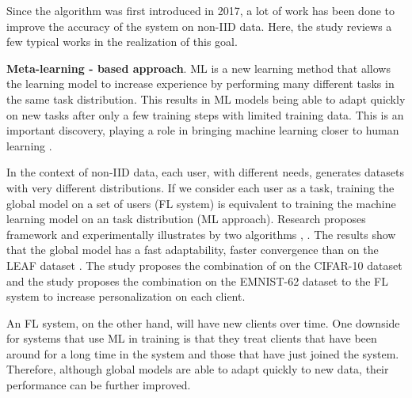 \documentclass[runningheads]{llncs}
\begin{document}
Since the  algorithm was first introduced in 2017, a lot of work has been done to improve the accuracy of the system on non-IID data. Here, the study reviews a few typical works in the realization of this goal.



\textbf{Meta-learning - based approach}. ML is a new learning method that allows the learning model to increase experience by performing many different tasks in the same task distribution. This results in ML models being able to adapt quickly on new tasks after only a few training steps with limited training data. This is an important discovery, playing a role in bringing machine learning closer to human learning \cite{harlow1949formation}.


In the context of non-IID data, each user, with different needs, generates datasets with very different distributions. If we consider each user as a task, training the global model on a set of users (FL system) is equivalent to training the machine learning model on an task distribution (ML approach). Research \cite{chen2018federated} proposes framework  and experimentally illustrates by two algorithms , . The results show that the global model has a fast adaptability, faster convergence than  on the LEAF dataset \cite{caldas2018leaf}. The study \cite{fallah2020personalized} proposes the combination of  on the CIFAR-10 dataset and the study \cite{jiang2019improving} proposes the combination  \cite{nichol2018first} on the EMNIST-62 dataset \cite{cohen2017emnist} to the FL system to increase personalization on each client.

An FL system, on the other hand, will have new clients over time. One downside for systems that use ML in training is that they treat clients that have been around for a long time in the system and those that have just joined the system. Therefore, although global models are able to adapt quickly to new data, their performance can be further improved.
\end{document}
